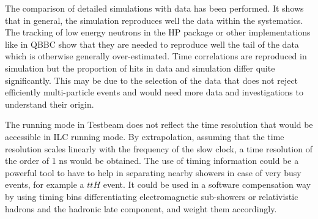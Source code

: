 The comparison of detailed simulations with data has been performed. It shows that in general, the simulation reproduces well the data within the systematics. The tracking of low energy neutrons in the HP package or other implementations like in QBBC show that they are needed to reproduce well the tail of the data which is otherwise generally over-estimated. Time correlations are reproduced in simulation but the proportion of hits in data and simulation differ quite significantly. This may be due to the selection of the data that does not reject efficiently multi-particle events and would need more data and investigations to understand their origin.

The running mode in Testbeam does not reflect the time resolution that would be accessible in ILC running mode. By extrapolation, assuming that the time resolution scales linearly with the frequency of the slow clock, a time resolution of the order of 1 ns would be obtained. The use of timing information could be a powerful tool to have to help in separating nearby showers in case of very busy events, for example a $ttH$ event. It could be used in a software compensation way by using timing bins differentiating electromagnetic sub-showers or relativistic hadrons and the hadronic late component, and weight them accordingly.
